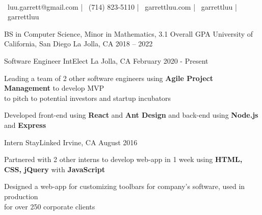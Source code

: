 \documentclass[]{awesome-cv}
\begin{document}
\begin{center}
	\vspace{-5mm}
	  \\
	\vspace{2mm}
  {\faEnvelope\ luu.garrett@gmail.com} | {\faMobile\ (714) 823-5110} |
  {\faLink\ garrettluu.com} |
  {\faGithub\ garrettluu} | {\faLinkedinSquare\ garrettluu}
\end{center}
\vspace{-3mm}
\begin{cventries}
	\cventry
	{BS in Computer Science, Minor in Mathematics, 3.1 Overall GPA}
	{University of California, San Diego}
	{La Jolla, CA}
	{2018 – 2022}
	{}
\end{cventries}

\vspace{-8mm}
\begin{cventries}
	\cventry
	{Software Engineer}
	{IntElect}
	{La Jolla, CA}
	{February 2020 - Present}
	{\begin{cvitems}
    \item {Leading a team of 2 other software engineers using \textbf{Agile
      Project Management} to develop MVP \\ to pitch to potential investors and
      startup incubators}
    \item {Developed front-end using \textbf{React} and \textbf{Ant Design}
      and back-end using \textbf{Node.js} and \textbf{Express}}
		\end{cvitems}}

	\vspace{-3mm}
	\cventry
	{Intern}
	{StayLinked}
	{Irvine, CA}
	{August 2016}
	{\begin{cvitems}
    \item {Partnered with 2 other interns to develop web-app in 1 week using
      \textbf{HTML, CSS, jQuery} with \textbf{JavaScript}}
		\item {Designed a web-app for customizing toolbars for company’s software,
      used in production\\ for over 250 corporate clients}
		\end{cvitems}}
\end{cventries}
\end{document}
